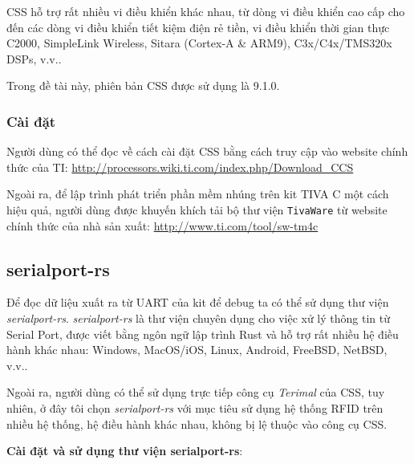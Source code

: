 CSS hỗ trợ rất nhiều vi điều khiển khác nhau, từ dòng vi điều khiển cao cấp cho đến các dòng vi điều khiển tiết kiệm điện rẻ tiền, vi điều khiển thời gian thực C2000, SimpleLink Wireless, Sitara (Cortex-A \& ARM9), C3x/C4x/TMS320x DSPs, v.v..

Trong đề tài này, phiên bản CSS được sử dụng là 9.1.0.

\medskip
\subsubsection{Cài đặt}
Người dùng có thể đọc về cách cài đặt CSS bằng cách truy cập vào website chính thức của TI: \url{http://processors.wiki.ti.com/index.php/Download_CCS}

Ngoài ra, để lập trình phát triển phần mềm nhúng trên kit TIVA C một cách hiệu quả, người dùng được khuyến khích tải bộ thư viện \texttt{TivaWare} từ website chính thức của nhà sản xuất: \url{http://www.ti.com/tool/sw-tm4c}

\subsection{serialport-rs}
Để đọc dữ liệu xuất ra từ UART của kit để debug ta có thể sử dụng thư viện \emph{serialport-rs}.
\emph{serialport-rs} là thư viện chuyên dụng cho việc xử lý thông tin từ Serial Port, được viết bằng ngôn ngữ lập trình Rust và hỗ trợ rất nhiều hệ điều hành khác nhau: Windows, MacOS/iOS, Linux, Android, FreeBSD, NetBSD, v.v..

Ngoài ra, người dùng có thể sử dụng trực tiếp công cụ \emph{Terimal} của CSS, tuy nhiên, ở đây tôi chọn \emph{serialport-rs} với mục tiêu sử dụng hệ thống RFID trên nhiều hệ thống, hệ điều hành khác nhau, không bị lệ thuộc vào công cụ CSS.

\medskip
\textbf{Cài đặt và sử dụng thư viện serialport-rs}:

